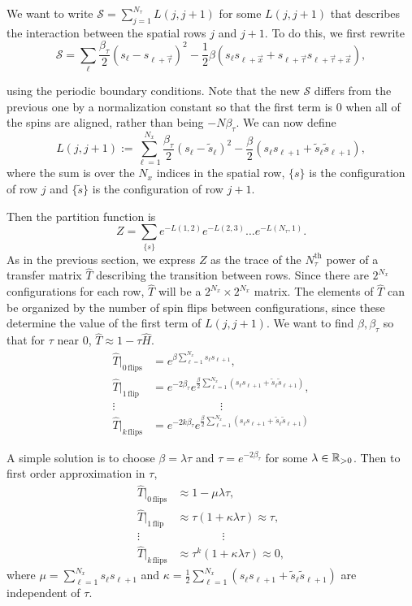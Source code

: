 \documentclass[10pt,reqno]{amsart}
\numberwithin{equation}{section}
\begin{document}
	We want to write $\mathcal{S}=\sum_{j=1}^{N_\tau} L(j,j+1)$ for some $L(j,j+1)$ that describes the interaction between the spatial rows $j$ and $j+1$.
	To do this, we first rewrite 
	\[\mathcal{S}=\sum_{\ell}\frac{\beta_\tau}{2}(s_{\ell}-s_{\ell+\vec{\tau}})^2 -\frac{1}{2}\beta (s_\ell s_{\ell+\vec{x}}+s_{\ell+\vec{\tau}}s_{\ell+\vec{\tau}+\vec{x}}), \]
	
	using the periodic boundary conditions. 
	Note that the new $\mathcal{S}$ differs from the previous one by a normalization constant so that the first term is 0 when all of the spins are aligned, rather than being $-N\beta_\tau$.
	We can now define 
	\[L(j,j+1):= \sum_{\ell=1}^{N_x} \frac{\beta_\tau}{2} (s_\ell-\tilde{s}_\ell)^2-\frac{\beta}{2}(s_\ell s_{\ell+1}+\tilde{s}_\ell \tilde{s}_{\ell+1}), \]
	where the sum is over the $N_x$ indices in the spatial row, $\{s\}$ is the configuration of row $j$ and $\{\tilde{s}\}$ is the configuration of row $j+1$.
	
	Then the partition function is 
	\[ Z=\sum_{\{s\}} e^{-L(1,2)}e^{-L(2,3)}\ldots e^{-L(N_\tau,1)}. \]
	As in the previous section, we express $Z$ as the trace of the $N_\tau^\text{th}$ power of a transfer matrix $\hat{T}$ describing the transition between rows. 
	Since there are $2^{N_x}$ configurations for each row, $\hat{T}$ will be a $2^{N_x}\times 2^{N_x}$ matrix.
	The elements of $\hat{T}$ can be organized by the number of spin flips between configurations, since these determine the value of the first term of $L(j,j+1)$. We want to find $\beta,\beta_\tau$ so that for $\tau$ near 0, $\hat{T} \approx 1 - \tau \hat{H}$.
	\begin{align*}
		\hat{T}|_{0\,\text{flips}} &= e^{\beta \sum_{\ell=1}^{N_x} s_{\ell} s_{\ell+1}},  \\		
		\hat{T}|_{1\,\text{flip}} &= e^{-2\beta_\tau} e^{\frac{\beta}{2}\sum_{\ell=1}^{N_x}(s_\ell s_{\ell+1}+\tilde{s}_\ell \tilde{s}_{\ell+1})},\\
		\vdots \quad & \qquad\qquad\qquad \vdots \\		
		\hat{T}|_{k\,\text{flips}} &= e^{-2k\beta_\tau} e^{\frac{\beta}{2}\sum_{\ell=1}^{N_x}(s_\ell s_{\ell+1}+\tilde{s}_\ell \tilde{s}_{\ell+1})}		
	\end{align*}
	
	A simple solution is to choose $\beta =\lambda \tau$ and $\tau = e^{-2\beta_\tau}$ for some $\lambda \in \mathbb{R}_{>0}$.
	Then to first order approximation in $\tau$,
	\begin{align*}
		\hat{T}|_{0\,\text{flips}} &\approx 1-\mu\lambda\tau, \\
		\hat{T}|_{1\,\text{flip}} &\approx \tau (1+\kappa \lambda\tau) \approx \tau, \\
		\vdots \quad & \qquad\qquad \vdots \\		
		\hat{T}|_{k\,\text{flips}} &\approx \tau^k (1+\kappa \lambda\tau) \approx 0, 
	\end{align*}
    where $\mu=\sum_{\ell=1}^{N_x}s_{\ell}s_{\ell+1}$ and $\kappa=\frac{1}{2}\sum_{\ell=1}^{N_x} (s_{\ell}s_{\ell+1}+\tilde{s}_{\ell}\tilde{s}_{\ell+1})$ are independent of $\tau$.
    
\end{document}
